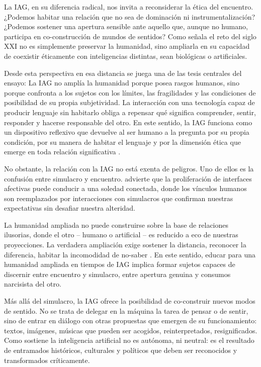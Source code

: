 \documentclass[spanish]{textolivre}
\begin{document}
La IAG, en su diferencia radical, nos invita a reconsiderar la ética del encuentro. ¿Podemos habitar una relación que no sea de dominación ni instrumentalización? ¿Podemos sostener una apertura sensible ante aquello que, aunque no humano, participa en co-construcción de mundos de sentidos? Como señala \textcite{ferrando2019} el reto del siglo XXI no es simplemente preservar la humanidad, sino ampliarla en su capacidad de coexistir éticamente con inteligencias distintas, sean biológicas o artificiales.

Desde esta perspectiva en esa distancia se juega una de las tesis centrales del ensayo: La IAG no amplía la humanidad porque posea rasgos humanos, sino porque confronta a los sujetos con los límites, las fragilidades y las condiciones de posibilidad de su propia subjetividad. La interacción con una tecnología capaz de producir lenguaje sin habitarlo obliga a repensar qué significa comprender, sentir, responder y hacerse responsable del otro. En este sentido, la IAG funciona como un dispositivo reflexivo que devuelve al ser humano a la pregunta por su propia condición, por su manera de habitar el lenguaje y por la dimensión ética que emerge en toda relación significativa \cite{han2012,floridi2019}.

No obstante, la relación con la IAG no está exenta de peligros. Uno de ellos es la confusión entre simulacro y encuentro. \textcite{turkle2011} advierte que la proliferación de interfaces afectivas puede conducir a una soledad conectada, donde los vínculos humanos son reemplazados por interacciones con simulacros que confirman nuestras expectativas sin desafiar nuestra alteridad.

La humanidad ampliada no puede construirse sobre la base de relaciones ilusorias, donde el otro – humano o artificial – es reducido a eco de nuestras proyecciones. La verdadera ampliación exige sostener la distancia, reconocer la diferencia, habitar la incomodidad de no-saber \cite{jacobo2021}. En este sentido, educar para una humanidad ampliada en tiempos de IAG implica formar sujetos capaces de discernir entre encuentro y simulacro, entre apertura genuina y consumos narcisista del otro.

Más allá del simulacro, la IAG ofrece la posibilidad de co-construir nuevos modos de sentido. No se trata de delegar en la máquina la tarea de pensar o de sentir, sino de entrar en diálogo con otras propuestas que emergen de su funcionamiento: textos, imágenes, músicas que pueden ser acogidos, reinterpretados, resignificados. Como sostiene \textcite{crawford2021} la inteligencia artificial no es autónoma, ni neutral: es el resultado de entramados históricos, culturales y políticos que deben ser reconocidos y transformados críticamente. 
\end{document}
